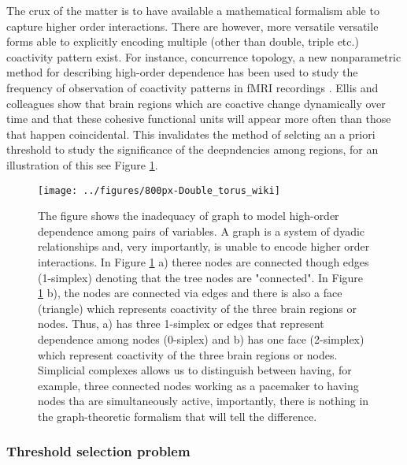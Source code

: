 \documentclass[onecollarge,runningheads]{svjour2}
\begin{document}
The crux of the matter is to have available a mathematical formalism able to capture higher order interactions. There are however, more versatile versatile forms able to explicitly encoding multiple (other than double, triple etc.) coactivity pattern exist. For instance, concurrence topology, a new nonparametric method for describing high-order dependence has been used to study the frequency of observation of coactivity patterns in fMRI recordings \cite{ellis2014describing}. Ellis and colleagues \cite{ellis2014describing} show that brain regions which are coactive change dynamically over time and that these cohesive functional units will appear more often than those that happen coincidental. This invalidates the method of selcting an a priori threshold to study the significance of the deepndencies among regions, for an illustration of this see Figure \ref{ex:dyadic}.

\begin{figure}[h]
        \centering
        \texttt{[image: ../figures/800px-Double\_torus\_wiki]}
        \caption{The figure shows the inadequacy of graph to model high-order dependence among pairs of variables. A graph is a system of dyadic relationships and, very importantly, is unable to encode higher order interactions. In Figure \ref{ex:dyadic} a) theree nodes are connected though edges (1-simplex) denoting that the tree nodes are "connected". In Figure \ref{ex:dyadic} b), the nodes are connected via edges and there is also a face (triangle) which represents coactivity of the three brain regions or nodes. Thus, a) has three 1-simplex or edges that represent dependence among nodes (0-siplex) and b) has one face (2-simplex) which represent coactivity of the three brain regions or nodes. Simplicial complexes allows us to distinguish between having, for example, three connected nodes working as a pacemaker to having nodes tha are simultaneously active, importantly, there is nothing in the graph-theoretic formalism that will tell the difference.
         }
\label{ex:dyadic}
\end{figure}

\subsubsection{Threshold selection problem}
\label{sse:thr}
\end{document}

